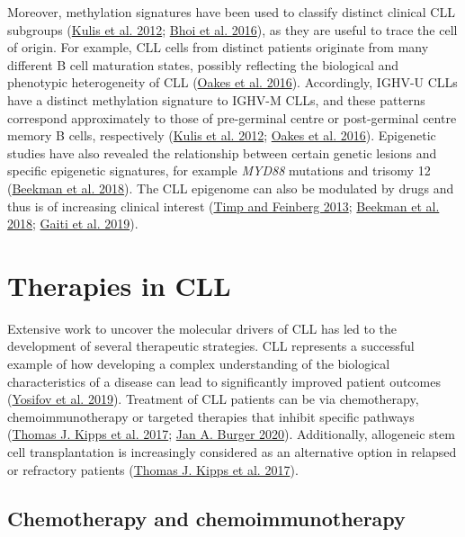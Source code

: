 \documentclass[11pt, a4paper, twosided]{book}
\begin{document}
Moreover, methylation signatures have been used to classify distinct clinical CLL subgroups (\protect\hyperlink{ref-Kulis2012}{Kulis et al. 2012}; \protect\hyperlink{ref-Bhoi2016}{Bhoi et al. 2016}), as they are useful to trace the cell of origin. For example, CLL cells from distinct patients originate from many different B cell maturation states, possibly reflecting the biological and phenotypic heterogeneity of CLL (\protect\hyperlink{ref-Oakes2016}{Oakes et al. 2016}). Accordingly, IGHV-U CLLs have a distinct methylation signature to IGHV-M CLLs, and these patterns correspond approximately to those of pre-germinal centre or post-germinal centre memory B cells, respectively (\protect\hyperlink{ref-Kulis2012}{Kulis et al. 2012}; \protect\hyperlink{ref-Oakes2016}{Oakes et al. 2016}). Epigenetic studies have also revealed the relationship between certain genetic lesions and specific epigenetic signatures, for example \emph{MYD88} mutations and trisomy 12 (\protect\hyperlink{ref-Beekman2018}{Beekman et al. 2018}). The CLL epigenome can also be modulated by drugs and thus is of increasing clinical interest (\protect\hyperlink{ref-Timp2013}{Timp and Feinberg 2013}; \protect\hyperlink{ref-Beekman2018}{Beekman et al. 2018}; \protect\hyperlink{ref-Gaiti2019}{Gaiti et al. 2019}).

\hypertarget{intro-therapies}{%
\section{Therapies in CLL}\label{intro-therapies}}

Extensive work to uncover the molecular drivers of CLL has led to the development of several therapeutic strategies. CLL represents a successful example of how developing a complex understanding of the biological characteristics of a disease can lead to significantly improved patient outcomes (\protect\hyperlink{ref-Yosifov2019}{Yosifov et al. 2019}).
Treatment of CLL patients can be via chemotherapy, chemoimmunotherapy or targeted therapies that inhibit specific pathways (\protect\hyperlink{ref-Kipps2017}{Thomas J. Kipps et al. 2017}; \protect\hyperlink{ref-Burger2020}{Jan A. Burger 2020}). Additionally, allogeneic stem cell transplantation is increasingly considered as an alternative option in relapsed or refractory patients (\protect\hyperlink{ref-Kipps2017}{Thomas J. Kipps et al. 2017}).

\hypertarget{intro-chemotherapy}{%
\subsection{Chemotherapy and chemoimmunotherapy}\label{intro-chemotherapy}}
\end{document}
